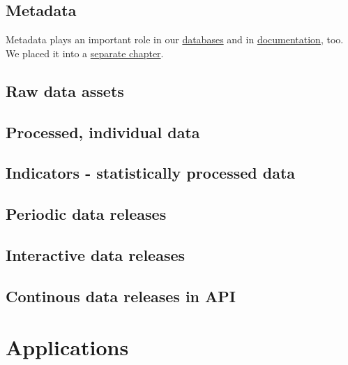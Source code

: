 \documentclass[
  fontsize=13pt,
  english,
  a4paper,
  openany, a4paper, oneside]{article}
\begin{document}
\hypertarget{storage-metadata}{%
\subsection{Metadata}\label{storage-metadata}}

Metadata plays an important role in our \protect\hyperlink{data-storage}{databases} and in \protect\hyperlink{documentation}{documentation}, too. We placed it into a \protect\hyperlink{metadata}{separate chapter}.

\hypertarget{dta-raw}{%
\subsection{Raw data assets}\label{dta-raw}}

\hypertarget{processed-individual-data}{%
\subsection{Processed, individual data}\label{processed-individual-data}}

\hypertarget{indicators---statistically-processed-data}{%
\subsection{Indicators - statistically processed data}\label{indicators---statistically-processed-data}}

\hypertarget{periodic-data-releases}{%
\subsection{Periodic data releases}\label{periodic-data-releases}}

\hypertarget{interactive-data-releases}{%
\subsection{Interactive data releases}\label{interactive-data-releases}}

\hypertarget{continous-data-releases-in-api}{%
\subsection{Continous data releases in API}\label{continous-data-releases-in-api}}

\hypertarget{applications}{%
\section{Applications}\label{applications}}
\end{document}
